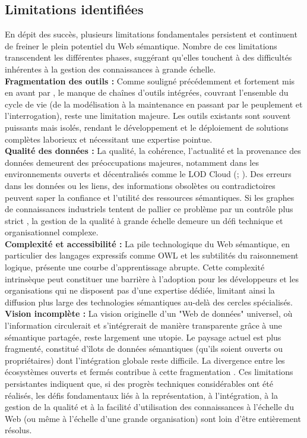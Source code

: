 \documentclass[9pt,twocolumn,twoside,french]{opticajnl}
\begin{document}
\subsection{Limitations identifiées}
En dépit des succès, plusieurs limitations fondamentales persistent et continuent de freiner le plein potentiel du Web sémantique. Nombre de ces limitations transcendent les différentes phases, suggérant qu'elles touchent à des difficultés inhérentes à la gestion des connaissances à grande échelle. \\
\textbf{Fragmentation des outils :} Comme souligné précédemment et fortement mis en avant par \citet{Hitzler2021}, le manque de chaînes d’outils intégrées, couvrant l’ensemble du cycle de vie (de la modélisation à la maintenance en passant par le peuplement et l’interrogation), reste une limitation majeure. Les outils existants sont souvent puissants mais isolés, rendant le développement et le déploiement de solutions complètes laborieux et nécessitant une expertise pointue. \\
\textbf{Qualité des données :} La qualité, la cohérence, l’actualité et la provenance des données demeurent des préoccupations majeures, notamment dans les environnements ouverts et décentralisés comme le LOD Cloud (\citealp{Jain2010}; \citealp{Tanon2014Assessing}). Des erreurs dans les données ou les liens, des informations obsolètes ou contradictoires peuvent saper la confiance et l’utilité des ressources sémantiques. Si les graphes de connaissances industriels tentent de pallier ce problème par un contrôle plus strict \citep{Noy2019Industryscale}, la gestion de la qualité à grande échelle demeure un défi technique et organisationnel complexe. \\
\textbf{Complexité et accessibilité :} La pile technologique du Web sémantique, en particulier des langages expressifs comme OWL et les subtilités du raisonnement logique, présente une courbe d’apprentissage abrupte. Cette complexité intrinsèque peut constituer une barrière à l’adoption pour les développeurs et les organisations qui ne disposent pas d’une expertise dédiée, limitant ainsi la diffusion plus large des technologies sémantiques au-delà des cercles spécialisés. \\
\textbf{Vision incomplète :} La vision originelle d'un "Web de données" universel, où l’information circulerait et s’intégrerait de manière transparente grâce à une sémantique partagée, reste largement une utopie. Le paysage actuel est plus fragmenté, constitué d’îlots de données sémantiques (qu'ils soient ouverts ou propriétaires) dont l’intégration globale reste difficile. La divergence entre les écosystèmes ouverts et fermés contribue à cette fragmentation \citep{Hitzler2021}.
Ces limitations persistantes indiquent que, si des progrès techniques considérables ont été réalisés, les défis fondamentaux liés à la représentation, à l’intégration, à la gestion de la qualité et à la facilité d’utilisation des connaissances à l’échelle du Web (ou même à l’échelle d’une grande organisation) sont loin d’être entièrement résolus.
\end{document}
